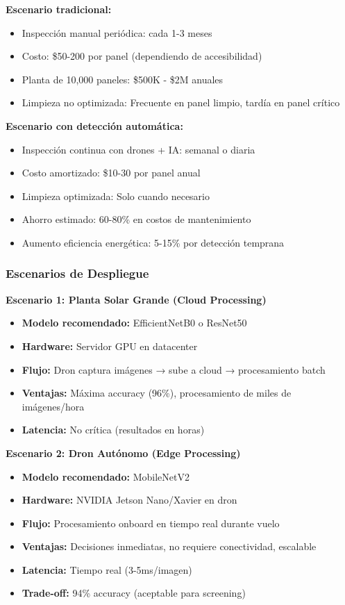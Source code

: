 \documentclass[11pt, a4paper]{article}
\begin{document}
\textbf{Escenario tradicional:}
\begin{itemize}
    \item Inspección manual periódica: cada 1-3 meses
    \item Costo: \$50-200 por panel (dependiendo de accesibilidad)
    \item Planta de 10,000 paneles: \$500K - \$2M anuales
    \item Limpieza no optimizada: Frecuente en panel limpio, tardía en panel crítico
\end{itemize}

\textbf{Escenario con detección automática:}
\begin{itemize}
    \item Inspección continua con drones + IA: semanal o diaria
    \item Costo amortizado: \$10-30 por panel anual
    \item Limpieza optimizada: Solo cuando necesario
    \item Ahorro estimado: 60-80\% en costos de mantenimiento
    \item Aumento eficiencia energética: 5-15\% por detección temprana
\end{itemize}

\subsubsection{Escenarios de Despliegue}

\textbf{Escenario 1: Planta Solar Grande (Cloud Processing)}

\begin{itemize}
    \item \textbf{Modelo recomendado:} EfficientNetB0 o ResNet50
    \item \textbf{Hardware:} Servidor GPU en datacenter
    \item \textbf{Flujo:} Dron captura imágenes → sube a cloud → procesamiento batch
    \item \textbf{Ventajas:} Máxima accuracy (96\%), procesamiento de miles de imágenes/hora
    \item \textbf{Latencia:} No crítica (resultados en horas)
\end{itemize}

\textbf{Escenario 2: Dron Autónomo (Edge Processing)}

\begin{itemize}
    \item \textbf{Modelo recomendado:} MobileNetV2
    \item \textbf{Hardware:} NVIDIA Jetson Nano/Xavier en dron
    \item \textbf{Flujo:} Procesamiento onboard en tiempo real durante vuelo
    \item \textbf{Ventajas:} Decisiones inmediatas, no requiere conectividad, escalable
    \item \textbf{Latencia:} Tiempo real (3-5ms/imagen)
    \item \textbf{Trade-off:} 94\% accuracy (aceptable para screening)
\end{itemize}
\end{document}
